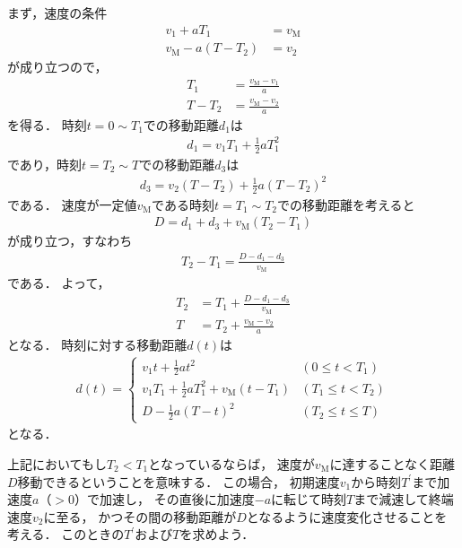 ﻿\documentclass[a4paper]{jsarticle}
\begin{document}
まず，速度の条件
\begin{align}
v_{1}+aT_{1}&=v_{\mathrm{M}} \\
v_{\mathrm{M}}-a(T-T_{2})&=v_{2}
\end{align}
が成り立つので，
\begin{align}
T_{1}&=\frac{v_{\mathrm{M}}-v_{1}}{a}
\label{eq:t1_from_vel}
\\
T-T_{2}&=\frac{v_{\mathrm{M}}-v_{2}}{a}
\label{eq:t2_from_vel}
\end{align}
を得る．
時刻$t=0\sim T_{1}$での移動距離$d_{1}$は
\begin{align}
d_{1}=v_{1}T_{1}+\frac{1}{2}aT_{1}^{2}
\label{eq:d1}
\end{align}
であり，時刻$t=T_{2}\sim T$での移動距離$d_{3}$は
\begin{align}
d_{3}=v_{2}(T-T_{2})+\frac{1}{2}a(T-T_{2})^{2}
\label{eq:d3}
\end{align}
である．
速度が一定値$v_{\mathrm{M}}$である時刻$t=T_{1}\sim T_{2}$での移動距離を考えると
\begin{align}
D=d_{1}+d_{3}+v_{\mathrm{M}}(T_{2}-T_{1})
\label{eq:total_distance}
\end{align}
が成り立つ，すなわち
\begin{align}
T_{2}-T_{1}=\frac{D-d_{1}-d_{3}}{v_{\mathrm{M}}}
\end{align}
である．
よって，
\begin{align}
T_{2}&=T_{1}+\frac{D-d_{1}-d_{3}}{v_{\mathrm{M}}}
\\
T&=T_{2}+\frac{v_{\mathrm{M}}-v_{2}}{a}
\end{align}
となる．
時刻に対する移動距離$d(t)$は
\begin{align}
d(t)=\begin{cases}
v_{1}t+\frac{1}{2}at^{2} & (0\leq t<T_{1})
\\
v_{1}T_{1}+\frac{1}{2}aT_{1}^{2}+v_{\mathrm{M}}(t-T_{1}) & (T_{1}\leq t<T_{2})
\\
D-\frac{1}{2}a(T-t)^{2} & (T_{2}\leq t\leq T)
\end{cases}
\end{align}
となる．




\begin{figure}[h]
\begin{center}

\end{center}
\end{figure}

上記においてもし$T_{2}<T_{1}$となっているならば，
速度が$v_{\mathrm{M}}$に達することなく距離$D$移動できるということを意味する．
この場合，
初期速度$v_{1}$から時刻$T^{\prime}$まで加速度$a$（$>0$）で加速し，
その直後に加速度$-a$に転じて時刻$T$まで減速して終端速度$v_{2}$に至る，
かつその間の移動距離が$D$となるように速度変化させることを考える．
このときの$T^{\prime}$および$T$を求めよう．
\end{document}
